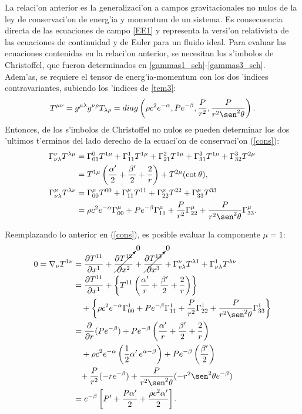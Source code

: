 La relaci'on anterior es la generalizaci'on a campos gravitacionales no nulos de la ley de conservaci'on de energ'ia y momentum de un sistema. Es consecuencia directa de las ecuaciones de campo \eqref{EE1} y representa la versi'on relativista de las ecuaciones de continuidad y de Euler para un fluido ideal. Para evaluar las ecuaciones contenidas en la relaci'on anterior, se necesitan los s'imbolos de Christoffel, que fueron determinados en \eqref{gammas1_sch}-\eqref{gammas3_sch}. Adem'as, se requiere el tensor de energ'ia-momentum con los dos 'indices contravariantes, subiendo los 'indices de \eqref{tem3}:
\begin{equation}
 T^{\mu\nu}=g^{\mu\lambda}g^{\nu\rho}T_{\lambda\rho}=diag\left(\rho c^2 e^{-\alpha},P e^{-\beta},\frac{P}{r^2}, \frac{P}{r^2\sen^2\theta}\right).
\end{equation}
Entonces, de los s'imbolos de Christoffel no nulos se pueden determinar los dos 'ultimos t'erminos del lado derecho de la ecuaci'on de conservaci'on (\ref{cons}):
\begin{align}
 \Gamma^{\nu}_{\nu\lambda}T^{\lambda\mu}&=\Gamma_{01}^{0}T^{1\mu}+\Gamma_{11}^{1}T^{1\mu}+\Gamma_{21}^{2}T^{1\mu}+\Gamma_{31}^3T^{1\mu}+\Gamma_{32}^3T^{2\mu}\\&=T^{1\mu}\left(\frac{\alpha'}{2}+\frac{\beta'}{2}+\frac{2}{r}\right)+T^{2\mu}(\cot\theta),\\
\Gamma^{\mu}_{\nu\lambda}T^{\lambda\nu}&=\Gamma_{00}^{\mu}T^{00}+\Gamma_{11}^{\mu}T^{11}+\Gamma_{22}^{\mu}T^{22}+\Gamma_{33}^{\mu}T^{33}\\&=\rho c^2e^{-\alpha}\Gamma^{\mu}_{00}+Pe^{-\beta}\Gamma^{\mu}_{11}+\frac{P}{r^2}\Gamma^{\mu}_{22}+\frac{P}{r^2\sen^2\theta}\Gamma^{\mu}_{33}.
\end{align}

Reemplazando lo anterior en (\ref{cons}), es posible evaluar la componente $\mu=1$:
\begin{align}
 0=\nabla_{\nu}T^{1\nu}&=\frac{\partial T^{11}}{\partial x^1}+\cancelto{0}{\frac{\partial T^{12}}{\partial x^2}}+\cancelto{0}{\frac{\partial T^{13}}{\partial x^3}}+\Gamma_{v\lambda}^{\nu}T^{\lambda1}+\Gamma_{\nu\lambda}^{1}T^{\lambda\nu}\\
&=\frac{\partial T^{11}}{\partial x^1}+\left\{T^{11}\left(\frac{\alpha'}{r}+\frac{\beta'}{2}+\frac{2}{r}\right)\right\} \nonumber\\
&\quad+\left\{\rho c^2 e^{-\alpha}\Gamma^{1}_{00}+Pe^{-\beta}\Gamma^{1}_{11}+\frac{P}{r^2}\Gamma^{1}_{22}+\frac{P}{r^2\sen^2\theta}\Gamma^{1}_{33}\right\}\\
&=\frac{\partial}{\partial r}(Pe^{-\beta})+Pe^{-\beta}\left(\frac{\alpha'}{r}+\frac{\beta'}{2}+\frac{2}{r}\right) \nonumber\\
&\quad+\rho c^2 e^{-\alpha}\left(\frac{1}{2}\alpha'\, e^{\alpha-\beta}\right)+Pe^{-\beta}\left(\frac{\beta'}{2}\right) \nonumber\\
&\phantom{+}+\frac{P}{r^2}(-re^{-\beta})+\frac{P}{r^2\sen^2\theta}(-r^2\sen^2\theta e^{-\beta})\\
&=e^{-\beta}\left[P'+\frac{P\alpha'}{2}+\frac{\rho c^2 \alpha'}{2}\right].
\end{align}

